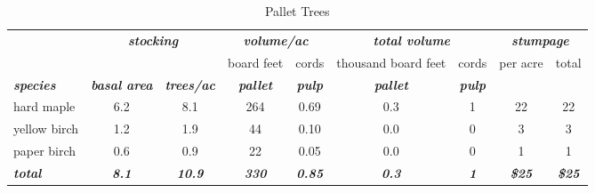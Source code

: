 \documentclass[landscape]{article}
\begin{document}
\begin{table}[H]

\caption{\label{tab:unnamed-chunk-55}Pallet Trees}
\fontsize{10}{12}\selectfont
\begin{tabular}[t]{lcccccccc}
\toprule
\multicolumn{1}{c}{\em{\textbf{ }}} & \multicolumn{2}{c}{\em{\textbf{stocking}}} & \multicolumn{2}{c}{\em{\textbf{volume/ac }}} & \multicolumn{2}{c}{\em{\textbf{total volume}}} & \multicolumn{2}{c}{\em{\textbf{stumpage}}} \\
\cmidrule(l{3pt}r{3pt}){2-3} \cmidrule(l{3pt}r{3pt}){4-5} \cmidrule(l{3pt}r{3pt}){6-7} \cmidrule(l{3pt}r{3pt}){8-9}
\multicolumn{3}{c}{ } & \multicolumn{1}{c}{board feet} & \multicolumn{1}{c}{cords} & \multicolumn{1}{c}{thousand board feet} & \multicolumn{1}{c}{cords} & \multicolumn{1}{c}{per acre} & \multicolumn{1}{c}{total} \\
\cmidrule(l{3pt}r{3pt}){4-4} \cmidrule(l{3pt}r{3pt}){5-5} \cmidrule(l{3pt}r{3pt}){6-6} \cmidrule(l{3pt}r{3pt}){7-7} \cmidrule(l{3pt}r{3pt}){8-8} \cmidrule(l{3pt}r{3pt}){9-9}
\rowcolor[HTML]{DCDCDC}  \em{\textbf{species}} & \em{\textbf{basal area}} & \em{\textbf{trees/ac}} & \em{\textbf{pallet}} & \em{\textbf{pulp}} & \em{\textbf{pallet}} & \em{\textbf{pulp}} & \em{\textbf{ }} & \em{\textbf{ }}\\
\midrule
\rowcolor{gray!6}  hard maple & 6.2 & 8.1 & 264 & 0.69 & 0.3 & 1 & 22 & 22\\
 
yellow birch & 1.2 & 1.9 & 44 & 0.10 & 0.0 & 0 & 3 & 3\\
 
\rowcolor{gray!6}  paper birch & 0.6 & 0.9 & 22 & 0.05 & 0.0 & 0 & 1 & 1\\
 
\rowcolor[HTML]{DCDCDC}  \em{\textbf{total}} & \em{\textbf{8.1}} & \em{\textbf{10.9}} & \em{\textbf{330}} & \em{\textbf{0.85}} & \em{\textbf{0.3}} & \em{\textbf{1}} & \em{\textbf{\$25}} & \em{\textbf{\$25}}\\
\bottomrule
\end{tabular}
\end{table}
\end{document}
